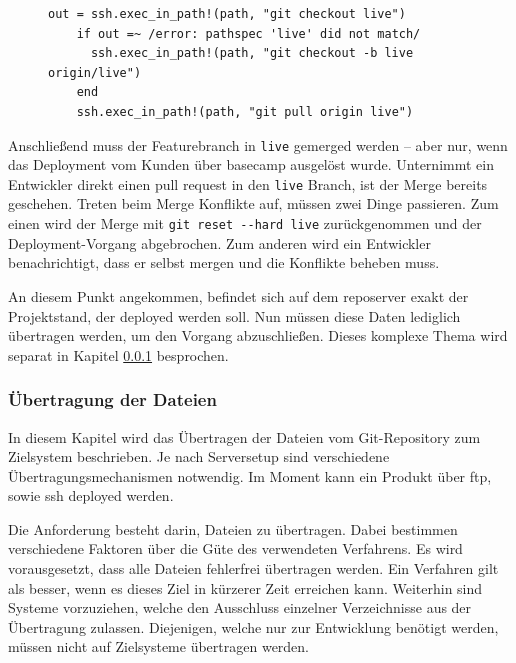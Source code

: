\begin{figure}
	\begin{lstlisting}[caption=Wechsel auf den aktualisierten Deployment Branch,label={lst:git_checkout_live}]
	out = ssh.exec_in_path!(path, "git checkout live")
	if out =~ /error: pathspec 'live' did not match/
	  ssh.exec_in_path!(path, "git checkout -b live origin/live")
	end
	ssh.exec_in_path!(path, "git pull origin live")
	\end{lstlisting}
\end{figure}

Anschließend muss der Featurebranch in \lstinline!live! gemerged werden -- aber nur, wenn das Deployment vom Kunden über \gls{basecamp} ausgelöst wurde. Unternimmt ein Entwickler direkt einen \gls{pull request} in den \lstinline!live! Branch, ist der Merge bereits geschehen. Treten beim Merge Konflikte auf, müssen zwei Dinge passieren. Zum einen wird der Merge mit \lstinline!git reset --hard live! zurückgenommen und der Deployment-Vorgang abgebrochen. Zum anderen wird ein Entwickler benachrichtigt, dass er selbst mergen und die Konflikte beheben muss.

An diesem Punkt angekommen, befindet sich auf dem \gls{reposerver} exakt der Projektstand, der deployed werden soll. Nun müssen diese Daten lediglich übertragen werden, um den Vorgang abzuschließen. Dieses komplexe Thema wird separat in Kapitel \ref{ssub:uebertragung_der_dateien} besprochen.


\subsubsection{Übertragung der Dateien} %
\label{ssub:uebertragung_der_dateien}

In diesem Kapitel wird das Übertragen der Dateien vom Git-Repository zum Zielsystem beschrieben. Je nach Serversetup sind verschiedene Übertragungsmechanismen notwendig. Im Moment kann ein Produkt über \gls{ftp}, sowie \gls{ssh} deployed werden.

Die Anforderung besteht darin, Dateien zu übertragen. Dabei bestimmen verschiedene Faktoren über die Güte des verwendeten Verfahrens. Es wird vorausgesetzt, dass alle Dateien fehlerfrei übertragen werden. Ein Verfahren gilt als besser, wenn es dieses Ziel in kürzerer Zeit erreichen kann. Weiterhin sind Systeme vorzuziehen, welche den Ausschluss einzelner Verzeichnisse aus der Übertragung zulassen. Diejenigen, welche nur zur Entwicklung benötigt werden, müssen nicht auf Zielsysteme übertragen werden.

